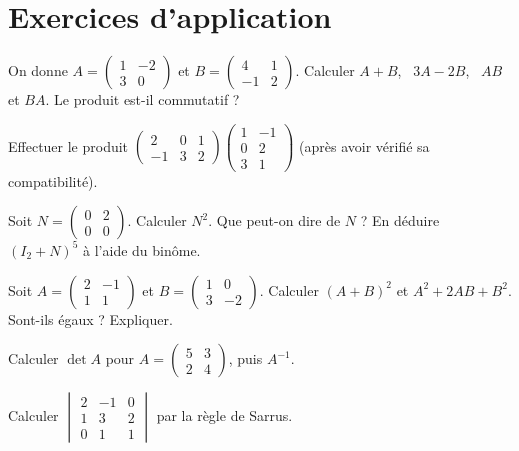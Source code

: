 \section{Exercices d'application}

\exo{} On donne $A=\begin{pmatrix}1&-2\\3&0\end{pmatrix}$ et $B=\begin{pmatrix}4&1\\-1&2\end{pmatrix}$.
Calculer $A+B$, \ $3A-2B$, \ $AB$ et $BA$. Le produit est-il commutatif ?

\exo{} Effectuer le produit
$\begin{pmatrix}2&0&1\\-1&3&2\end{pmatrix}\begin{pmatrix}1&-1\\0&2\\3&1\end{pmatrix}$
(après avoir vérifié sa compatibilité).

\exo{} Soit $N=\begin{pmatrix}0&2\\0&0\end{pmatrix}$. Calculer $N^2$. Que peut-on dire de $N$ ?
En déduire $(I_2+N)^{5}$ à l'aide du binôme.

\exo{} Soit $A=\begin{pmatrix}2&-1\\1&1\end{pmatrix}$ et $B=\begin{pmatrix}1&0\\3&-2\end{pmatrix}$.
Calculer $(A+B)^2$ et $A^2+2AB+B^2$. Sont-ils égaux ? Expliquer.

\exo{} Calculer $\det A$ pour $A=\begin{pmatrix}5&3\\2&4\end{pmatrix}$, puis $A^{-1}$.

\exo{} Calculer $\begin{vmatrix}2&-1&0\\1&3&2\\0&1&1\end{vmatrix}$ par la règle de Sarrus.

